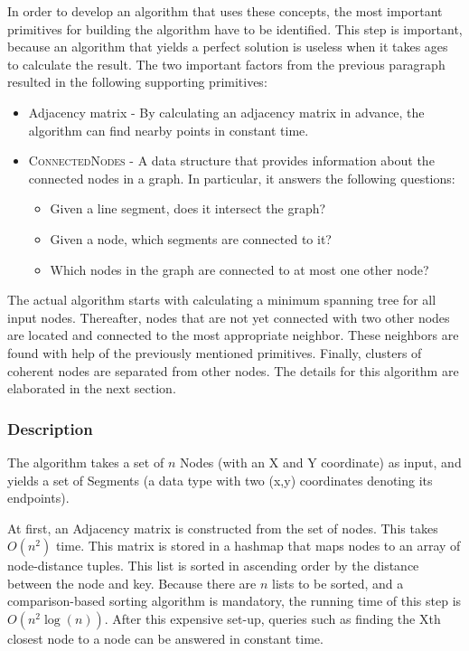 \documentclass[11pt]{article}
\begin{document}
In order to develop an algorithm that uses these concepts, the most important primitives for building the algorithm have to be identified. This step is important, because an algorithm that yields a perfect solution is useless when it takes ages to calculate the result. The two important factors from the previous paragraph resulted in the following supporting primitives:

\begin{itemize}
\item Adjacency matrix - By calculating an adjacency matrix in advance, the algorithm can find nearby points in constant time.
\item \textsc{ConnectedNodes} - A data structure that provides information about the connected nodes in a graph. In particular, it answers the following questions:
\begin{itemize}
\item Given a line segment, does it intersect the graph?
\item Given a node, which segments are connected to it?
\item Which nodes in the graph are connected to at most one other node?
\end{itemize}
\end{itemize}

The actual algorithm starts with calculating a minimum spanning tree for all input nodes. Thereafter, nodes that are not yet connected with two other nodes are located and connected to the most appropriate neighbor. These neighbors are found with help of the previously mentioned primitives. Finally, clusters of coherent nodes are separated from other nodes. The details for this algorithm are elaborated in the next section.

\subsubsection{Description}
The algorithm takes a set of $n$ Nodes (with an X and Y coordinate) as input, and yields a set of Segments (a data type with two (x,y) coordinates denoting its endpoints).

At first, an Adjacency matrix is constructed from the set of nodes. This takes $O(n^2)$ time. This matrix is stored in a hashmap that maps nodes to an array of node-distance tuples. This list is sorted in ascending order by the distance between the node and key. Because there are $n$ lists to be sorted, and a comparison-based sorting algorithm is mandatory, the running time of this step is $O(n^2 \log(n))$. After this expensive set-up, queries such as finding the Xth closest node to a node can be answered in constant time.
\end{document}

